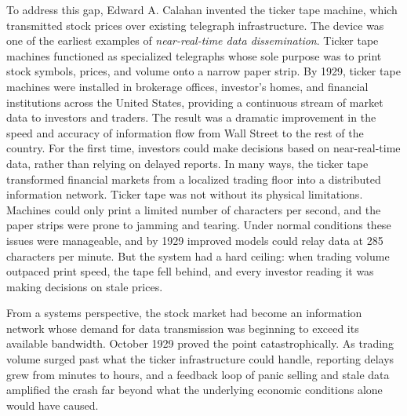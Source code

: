 To address this gap, Edward A. Calahan invented the ticker tape machine, which transmitted stock prices over existing telegraph infrastructure.
The device was one of the earliest examples of \textit{near-real-time data dissemination}.
Ticker tape machines functioned as specialized telegraphs whose sole purpose was to print stock symbols, prices, and volume onto a narrow paper strip. 
By 1929, ticker tape machines were installed in brokerage offices, investor's homes, and financial institutions across the United States, providing a continuous stream of market data to investors and traders.
The result was a dramatic improvement in the speed and accuracy of information flow from Wall Street to the rest of the country. For the first time, investors could make decisions based on near-real-time data, rather than relying on delayed reports.
In many ways, the ticker tape transformed financial markets from a localized trading floor into a distributed information network.
Ticker tape was not without its physical limitations. Machines could only print a limited number of characters per second, and the paper strips were prone to jamming and tearing.
Under normal conditions these issues were manageable, and by 1929 improved models could relay data at 285 characters per minute. But the system had a hard ceiling: when trading volume outpaced print speed, the tape fell behind, and every investor reading it was making decisions on stale prices.

From a systems perspective, the stock market had become an information network whose demand for data transmission was beginning to exceed its available bandwidth.
October 1929 proved the point catastrophically. As trading volume surged past what the ticker infrastructure could handle, reporting delays grew from minutes to hours, and a feedback loop of panic selling and stale data amplified the crash far beyond what the underlying economic conditions alone would have caused.

